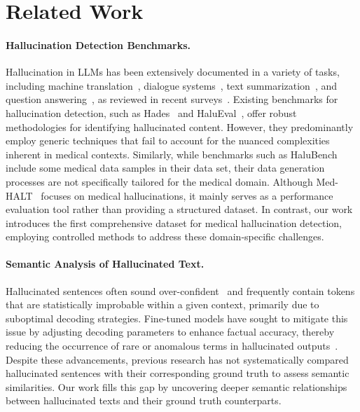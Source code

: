 \section{Related Work}
\vspace{-2mm}
\paragraph{Hallucination Detection Benchmarks.}
 Hallucination in LLMs has been extensively documented in a variety of tasks, including machine translation~\citep{lee2019hallucinations_13RW}, dialogue systems~\citep{balakrishnan-etal-2019-constrained_14RW}, text summarization~\citep{durmus-etal-2020-feqa_15RW}, and question answering~\citep{sellam2020bleurtlearningrobustmetrics_16RW}, as reviewed in recent surveys~\citep{Ji_2023_12RW}. Existing benchmarks for hallucination detection, such as Hades~\citep{liu2022tokenlevelreferencefreehallucinationdetection} and HaluEval~\citep{Hallueval}, offer robust methodologies for identifying hallucinated content. However, they predominantly employ generic techniques that fail to account for the nuanced complexities inherent in medical contexts. Similarly, while benchmarks such as HaluBench~\citep{ravi2024lynxopensourcehallucination} include some medical data samples in their data set, their data generation processes are not specifically tailored for the medical domain. Although Med-HALT~\citep{pal2023medhaltmedicaldomainhallucination} focuses on medical hallucinations, it mainly serves as a performance evaluation tool rather than providing a structured dataset. In contrast, our work introduces the first comprehensive dataset for medical hallucination detection, employing controlled methods to address these domain-specific challenges.
\vspace{-2mm}
\paragraph{Semantic Analysis of Hallucinated Text.}
Hallucinated sentences often sound over-confident~\citep{miao2021preventlanguagemodeloverconfident_overconfident, chen2022improvingfaithfulnessabstractivesummarization_overconfident} and frequently contain tokens that are statistically improbable within a given context, primarily due to suboptimal decoding strategies. Fine-tuned models have sought to mitigate this issue by adjusting decoding parameters to enhance factual accuracy, thereby reducing the occurrence of rare or anomalous terms in hallucinated outputs~\citep{Huang_2025_survey11}. Despite these advancements, previous research has not systematically compared hallucinated sentences with their corresponding ground truth to assess semantic similarities. Our work fills this gap by uncovering deeper semantic relationships between hallucinated texts and their ground truth counterparts.
\vspace{-2mm}

